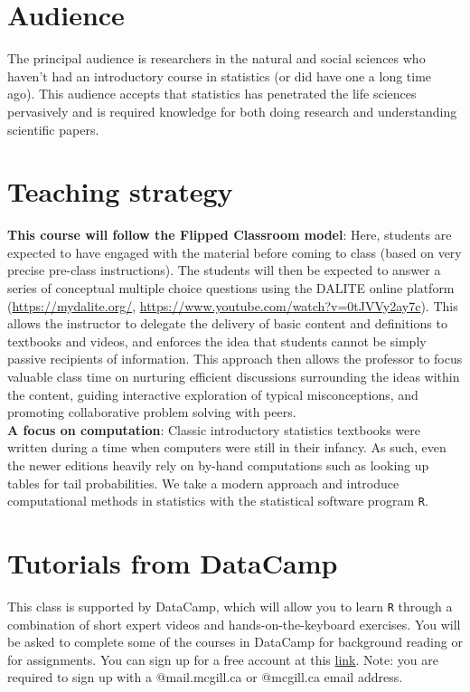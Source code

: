 \documentclass[]{article}
\begin{document}
\section{Audience}
The principal audience is researchers in the natural and social sciences who haven't had an introductory course in statistics (or did have one a long time ago). This audience accepts that statistics has penetrated the life sciences pervasively and is required knowledge for both doing research and understanding scientific papers.

\section{Teaching strategy}
\textbf{This course will follow the Flipped Classroom model}: Here, students are expected to have engaged with the material before coming to class (based on very precise pre-class instructions). The students will then be expected to answer a series of conceptual multiple choice questions using the DALITE online platform (\url{https://mydalite.org/}, \url{https://www.youtube.com/watch?v=0tJVVy2ay7c}). This allows the instructor to delegate the delivery of basic content and definitions to textbooks and videos, and enforces the idea that students cannot be simply passive recipients of information. This approach then allows the professor to focus valuable class time on nurturing efficient discussions surrounding the ideas within the content, guiding interactive exploration of typical misconceptions, and promoting collaborative problem solving with peers.\\

\textbf{A focus on computation}: Classic introductory statistics textbooks were written during a time when computers were still in their infancy. As such, even the newer editions heavily rely on by-hand computations such as looking up tables for tail probabilities. We take a modern approach and introduce computational methods in statistics with the statistical software program \texttt{R}.


\section{Tutorials from DataCamp}
This class is supported by DataCamp, which will allow you to learn \texttt{R} through a combination of short expert videos and hands-on-the-keyboard exercises. You will be asked to complete some of the courses in DataCamp for background reading or for assignments. You can sign up for a free account at this \href{https://www.datacamp.com/groups/shared_links/4c7d78a632b557dfdd6618b3e8fac09495571fec}{link}. Note: you are required to sign up with a @mail.mcgill.ca or @mcgill.ca email address.
\end{document}
